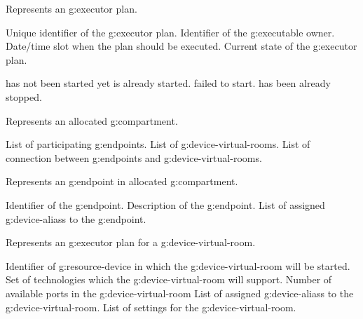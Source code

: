 \begin{Api}
Represents an \gls{g:executor} plan.
\begin{ApiClassAttributes}
 Unique identifier of the \gls{g:executor} plan.
 Identifier of the \gls{g:executable} owner.
 Date/time slot when the plan should be executed.
 Current state of the \gls{g:executor} plan.
\end{ApiClassAttributes}

\begin{ApiEnumValues}
  has not been started yet
  is already started.
  failed to start.
  has been already stopped.
\end{ApiEnumValues}

Represents an allocated \gls{g:compartment}.
\begin{ApiClassAttributes}
 List of participating \glspl{g:endpoint}.
 List of \glspl{g:device-virtual-room}.
 List of connection between \glspl{g:endpoint} and \glspl{g:device-virtual-room}.
\end{ApiClassAttributes}

Represents an \gls{g:endpoint} in allocated \gls{g:compartment}.
\begin{ApiClassAttributes}
 Identifier of the \gls{g:endpoint}.
 Description of the \gls{g:endpoint}.
 List of assigned \glspl{g:device-alias} to the \gls{g:endpoint}.
\end{ApiClassAttributes}

Represents an \gls{g:executor} plan for a \gls{g:device-virtual-room}.
\begin{ApiClassAttributes}
 Identifier of \gls{g:resource-device} in which the \gls{g:device-virtual-room} will be started.
 Set of technologies which the \gls{g:device-virtual-room} will support.
 Number of available ports in the \gls{g:device-virtual-room}
 List of assigned \glspl{g:device-alias} to the \gls{g:device-virtual-room}.
 List of settings for the \gls{g:device-virtual-room}.
\end{ApiClassAttributes}


\end{Api}
